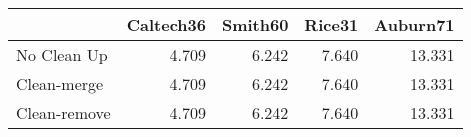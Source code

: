 \begin{tabular}{lrrrr}
\toprule
{} & Caltech36 & Smith60 & Rice31 & Auburn71 \\
\midrule
No Clean Up  &     4.709 &   6.242 &  7.640 &   13.331 \\
Clean-merge  &     4.709 &   6.242 &  7.640 &   13.331 \\
Clean-remove &     4.709 &   6.242 &  7.640 &   13.331 \\
\bottomrule
\end{tabular}
